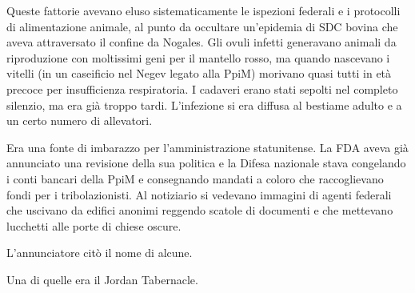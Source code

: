 Queste fattorie avevano eluso sistematicamente le ispezioni federali e i
protocolli di alimentazione animale, al punto da occultare un'epidemia
di SDC bovina che aveva attraversato il confine da Nogales. Gli ovuli
infetti generavano animali da riproduzione con moltissimi geni per il
mantello rosso, ma quando nascevano i vitelli (in un caseificio nel
Negev legato alla PpiM) morivano quasi tutti in età precoce per
insufficienza respiratoria. I cadaveri erano stati sepolti nel completo
silenzio, ma era già troppo tardi. L'infezione si era diffusa al
bestiame adulto e a un certo numero di allevatori.

Era una fonte di imbarazzo per l'amministrazione statunitense. La FDA
aveva già annunciato una revisione della sua politica e la Difesa
nazionale stava congelando i conti bancari della PpiM e consegnando
mandati a coloro che raccoglievano fondi per i tribolazionisti. Al
notiziario si vedevano immagini di agenti federali che uscivano da
edifici anonimi reggendo scatole di documenti e che mettevano lucchetti
alle porte di chiese oscure.

L'annunciatore citò il nome di alcune.

Una di quelle era il Jordan Tabernacle.